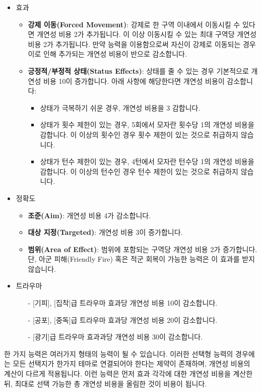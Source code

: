 \documentclass[12pt]{report}
\begin{document}
\begin{itemize}
		\item 효과
		\begin{itemize}
			\item \textbf{강제 이동(Forced Movement)}: 강제로 한 구역 이내에서 이동시킬 수 있다면 개연성 비용 2가 추가됩니다. 이 이상 이동시킬 수 있는 최대 구역당 개연성 비용 2가 추가됩니다. 만약 능력을 이용함으로써 자신이 강제로 이동되는 경우 이로 인해 추가되는 개연성 비용이 반으로 감소합니다.
			\item \textbf{긍정적/부정적 상태(Status Effects)}: 상태를 줄 수 있는 경우 기본적으로 개연성 비용 10이 증가합니다. 아래 사항에 해당한다면 개연성 비용이 감소합니다:
			\begin{itemize}
				\item 상태가 극복하기 쉬운 경우, 개연성 비용을 3 감합니다.
				\item 상태가 횟수 제한이 있는 경우, 5회에서 모자란 횟수당 1의 개연성 비용을 감합니다. 이 이상의 횟수인 경우 횟수 제한이 있는 것으로 취급하지 않습니다.
				\item 상태가 턴수 제한이 있는 경우, 4턴에서 모자란 턴수당 1의 개연성 비용을 감합니다. 이 이상의 턴수인 경우 턴수 제한이 있는 것으로 취급하지 않습니다.
			\end{itemize}
		\end{itemize}
		
		\item 정확도
		\begin{itemize}
			\item \textbf{조준(Aim)}: 개연성 비용 4가 감소합니다.
			\item \textbf{대상 지정(Targeted)}: 개연성 비용 3이 증가합니다.
			\item \textbf{범위(Area of Effect)}: 범위에 포함되는 구역당 개연성 비용 2가 증가합니다. 단, 아군 피해(Friendly Fire) 혹은 적군 회복이 가능한 능력은 이 효과를 받지 않습니다.
		\end{itemize}
		
		\item 트라우마
		\begin{itemize}
			\item[-] [기피], [집착]급 트라우마 효과당 개연성 비용 10이 감소합니다.
			\item[-] [공포], [중독]급 트라우마 효과당 개연성 비용 20이 감소합니다.
			\item[-] [광기]급 트라우마 효과과당 개연성 비용 30이 감소합니다.
		\end{itemize}
	\end{itemize}
	
	한 가지 능력은 여러가지 형태의 능력이 될 수 있습니다. 이러한 선택형 능력의 경우에는 모든 선택지가 한가지 테마로 연결되어야 한다는 제약이 존재하며, 개연성 비용의 계산이 다르게 적용됩니다. 이런 능력은 먼저 효과 각각에 대한 개연성 비용을 계산한 뒤, 최대로 선택 가능한 총 개연성 비용을 올림한 것이 비용이 됩니다.
	
\end{document}
